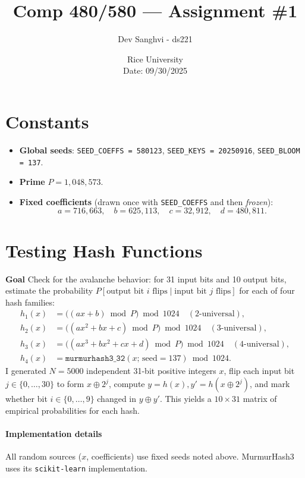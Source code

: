 \documentclass[11pt]{article}
\title{Comp 480/580 --- Assignment \#1}
\author{Dev Sanghvi - ds221}
\date{Rice University \\ Date: 09/30/2025}
\begin{document}
\maketitle

\section*{Constants}
\begin{itemize}
  \item \textbf{Global seeds}: \verb|SEED_COEFFS = 580123|, \verb|SEED_KEYS = 20250916|, \verb|SEED_BLOOM = 137|.
  \item \textbf{Prime} \(P = 1{,}048{,}573\).
  \item \textbf{Fixed coefficients} (drawn once with \verb|SEED_COEFFS| and then \emph{frozen}):
  \[
    a=716{,}663,\quad b=625{,}113,\quad c=32{,}912,\quad d=480{,}811.
  \]
\end{itemize}

\newpage
\section{Testing Hash Functions }
\textbf{Goal} Check for the avalanche behavior: for 31 input bits and 10 output bits, estimate the probability \(P[\text{output bit } i \text{ flips} \mid \text{input bit } j \text{ flips}]\)
for each of four hash families:
\begin{align*}
  h_1(x) &= \big((ax + b) \bmod P\big) \bmod 1024 \quad (\text{2-universal}),\\
  h_2(x) &= \big((ax^2 + bx + c) \bmod P\big) \bmod 1024 \quad (\text{3-universal}),\\
  h_3(x) &= \big((ax^3 + bx^2 + cx + d) \bmod P\big) \bmod 1024 \quad (\text{4-universal}),\\
  h_4(x) &= \texttt{murmurhash3\_32}(x;\,\text{seed}=137) \bmod 1024.
\end{align*}
I generated \(N=5000\) independent 31-bit positive integers \(x\), flip each input bit \(j\in\{0,\ldots,30\}\) to form \(x\oplus 2^j\), compute \(y=h(x), y'=h(x\oplus 2^j)\), and mark whether bit \(i\in\{0,\ldots,9\}\) changed in \(y\oplus y'\). This yields a \(10\times 31\) matrix of empirical probabilities for each hash.

\paragraph{Implementation details} All random sources (\(x\), coefficients) use fixed seeds noted above. MurmurHash3 uses its \texttt{scikit-learn}  implementation.
\end{document}
